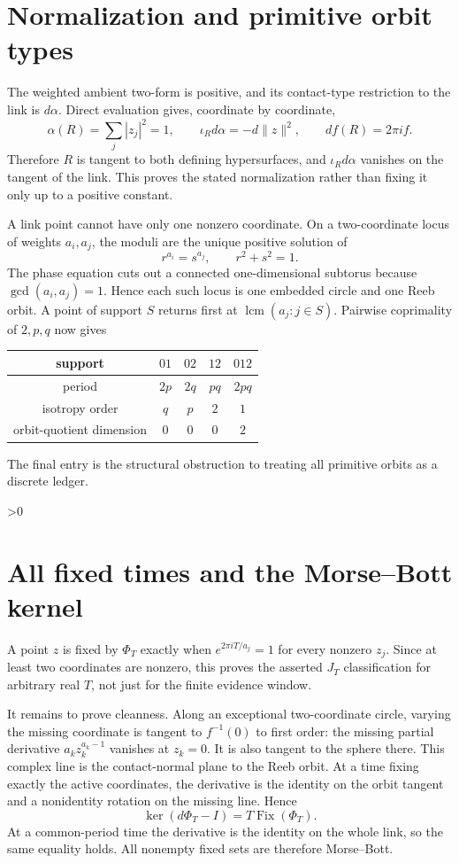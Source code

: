 \documentclass[10pt]{article}
\newcommand{\Fix}{\operatorname{Fix}}
\begin{document}
\section{Normalization and primitive orbit types}
The weighted ambient two-form is positive, and its contact-type restriction to
the link is $d\alpha$.  Direct evaluation gives, coordinate by coordinate,
\[
 \alpha(R)=\sum_j|z_j|^2=1,\qquad
 \iota_Rd\alpha=-d\|z\|^2,\qquad df(R)=2\pi i f.
\]
Therefore $R$ is tangent to both defining hypersurfaces, and
$\iota_Rd\alpha$ vanishes on the tangent of the link.  This proves the stated
normalization rather than fixing it only up to a positive constant.

A link point cannot have only one nonzero coordinate.  On a two-coordinate
locus of weights $a_i,a_j$, the moduli are the unique positive solution of
\[
 r^{a_i}=s^{a_j},\qquad r^2+s^2=1.
\]
The phase equation cuts out a connected one-dimensional subtorus because
$\gcd(a_i,a_j)=1$.  Hence each such locus is one embedded circle and one Reeb
orbit.  A point of support $S$ returns first at $\operatorname{lcm}(a_j:j\in S)$.
Pairwise coprimality of $2,p,q$ now gives
\begin{center}
\begin{tabular}{ccccc}
\toprule
support & $01$ & $02$ & $12$ & $012$\\
\midrule
period & $2p$ & $2q$ & $pq$ & $2pq$\\
isotropy order & $q$ & $p$ & $2$ & $1$\\
orbit-quotient dimension & $0$ & $0$ & $0$ & $2$\\
\bottomrule
\end{tabular}
\end{center}
The final entry is the structural obstruction to treating all primitive orbits
as a discrete ledger.

\ifnum\CRevisionRound>0
\section{All fixed times and the Morse--Bott kernel}
A point $z$ is fixed by $\Phi_T$ exactly when
$e^{2\pi iT/a_j}=1$ for every nonzero $z_j$.  Since at least two coordinates
are nonzero, this proves the asserted $J_T$ classification for arbitrary real
$T$, not just for the finite evidence window.

It remains to prove cleanness.  Along an exceptional two-coordinate circle,
varying the missing coordinate is tangent to $f^{-1}(0)$ to first order:
the missing partial derivative $a_kz_k^{a_k-1}$ vanishes at $z_k=0$.  It is
also tangent to the sphere there.  This complex line is the contact-normal
plane to the Reeb orbit.  At a time fixing exactly the active coordinates,
the derivative is the identity on the orbit tangent and a nonidentity rotation
on the missing line.  Hence
\[
 \ker(d\Phi_T-I)=T\Fix(\Phi_T).
\]
At a common-period time the derivative is the identity on the whole link, so
the same equality holds.  All nonempty fixed sets are therefore Morse--Bott.
\end{document}
